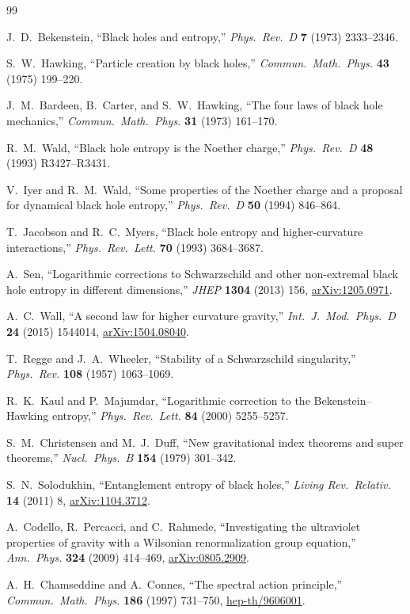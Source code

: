 \documentclass[11pt,a4paper]{article}
\theoremstyle{plain}
\theoremstyle{definition}
\begin{document}
\begin{thebibliography}{99}

J.~D.~Bekenstein,
``Black holes and entropy,''
\emph{Phys.\ Rev.\ D} \textbf{7} (1973) 2333--2346.

S.~W.~Hawking,
``Particle creation by black holes,''
\emph{Commun.\ Math.\ Phys.} \textbf{43} (1975) 199--220.

J.~M.~Bardeen, B.~Carter, and S.~W.~Hawking,
``The four laws of black hole mechanics,''
\emph{Commun.\ Math.\ Phys.} \textbf{31} (1973) 161--170.

R.~M.~Wald,
``Black hole entropy is the Noether charge,''
\emph{Phys.\ Rev.\ D} \textbf{48} (1993) R3427--R3431.

V.~Iyer and R.~M.~Wald,
``Some properties of the Noether charge and a proposal for dynamical
black hole entropy,''
\emph{Phys.\ Rev.\ D} \textbf{50} (1994) 846--864.

T.~Jacobson and R.~C.~Myers,
``Black hole entropy and higher-curvature interactions,''
\emph{Phys.\ Rev.\ Lett.} \textbf{70} (1993) 3684--3687.

A.~Sen,
``Logarithmic corrections to Schwarzschild and other non-extremal
black hole entropy in different dimensions,''
\emph{JHEP} \textbf{1304} (2013) 156,
\href{https://arxiv.org/abs/1205.0971}{arXiv:1205.0971}.

A.~C.~Wall,
``A second law for higher curvature gravity,''
\emph{Int.\ J.\ Mod.\ Phys.\ D} \textbf{24} (2015) 1544014,
\href{https://arxiv.org/abs/1504.08040}{arXiv:1504.08040}.

T.~Regge and J.~A.~Wheeler,
``Stability of a Schwarzschild singularity,''
\emph{Phys.\ Rev.} \textbf{108} (1957) 1063--1069.

R.~K.~Kaul and P.~Majumdar,
``Logarithmic correction to the Bekenstein--Hawking entropy,''
\emph{Phys.\ Rev.\ Lett.} \textbf{84} (2000) 5255--5257.

S.~M.~Christensen and M.~J.~Duff,
``New gravitational index theorems and super theorems,''
\emph{Nucl.\ Phys.\ B} \textbf{154} (1979) 301--342.

S.~N.~Solodukhin,
``Entanglement entropy of black holes,''
\emph{Living Rev.\ Relativ.} \textbf{14} (2011) 8,
\href{https://arxiv.org/abs/1104.3712}{arXiv:1104.3712}.

A.~Codello, R.~Percacci, and C.~Rahmede,
``Investigating the ultraviolet properties of gravity with a
Wilsonian renormalization group equation,''
\emph{Ann.\ Phys.} \textbf{324} (2009) 414--469,
\href{https://arxiv.org/abs/0805.2909}{arXiv:0805.2909}.

A.~H.~Chamseddine and A.~Connes,
``The spectral action principle,''
\emph{Commun.\ Math.\ Phys.} \textbf{186} (1997) 731--750,
\href{https://arxiv.org/abs/hep-th/9606001}{hep-th/9606001}.

\end{thebibliography}
\end{document}
